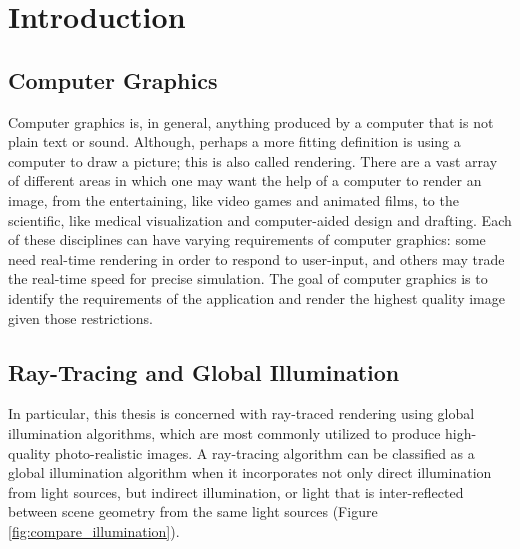 \chapter{Introduction}

\section{Computer Graphics}
Computer graphics is, in general, anything produced by a computer that is not plain text or sound. Although, perhaps a more fitting definition is using a computer to draw a picture; this is also called rendering. There are a vast array of different areas in which one may want the help of a computer to render an image, from the entertaining, like video games and animated films, to the scientific, like medical visualization and computer-aided design and drafting. Each of these disciplines can have varying requirements of computer graphics: some need real-time rendering in order to respond to user-input, and others may trade the real-time speed for precise simulation. The goal of computer graphics is to identify the requirements of the application and render the highest quality image given those restrictions.

\section{Ray-Tracing and Global Illumination}
\label{sec:ray_tracing_intro}
In particular, this thesis is concerned with ray-traced rendering using global illumination algorithms, which are most commonly utilized to produce high-quality photo-realistic images. A ray-tracing algorithm can be classified as a global illumination algorithm when it incorporates not only direct illumination from light sources, but indirect illumination, or light that is inter-reflected between scene geometry from the same light sources (Figure \ref{fig:compare_illumination}).

